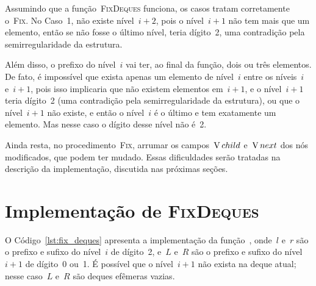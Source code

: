 \documentclass[main.tex]{subfiles}
\begin{document}
Assumindo que a função~\textsc{FixDeques} funciona, os casos tratam corretamente o~\textsc{Fix}. No Caso~1, não existe nível~${i+2}$, pois o nível~${i+1}$ não tem mais que um elemento, então se não fosse o último nível, teria dígito~2, uma contradição pela semirregularidade da estrutura.

Além disso, o prefixo do nível~$i$ vai ter, ao final da função, dois ou três elementos. De fato, é impossível que exista apenas um elemento de nível~$i$ entre os níveis~$i$ e~$i+1$, pois isso implicaria que não existem elementos em~$i+1$, e o nível~$i+1$ teria dígito~2 (uma contradição pela semirregularidade da estrutura), ou que o nível~${i+1}$ não existe, e então o nível~$i$ é o último e tem exatamente um elemento. Mas nesse caso o dígito desse nível não é~2.

Ainda resta, no procedimento~\textsc{Fix}, arrumar os campos~$\operatorname{V}{child}$ e~$\operatorname{V}{next}$ dos nós modificados, que podem ter mudado. Essas dificuldades serão tratadas na descrição da implementação, discutida nas próximas seções.

\section{Implementação de {\normalfont \textsc{FixDeques}}} \label{sec:fix_deques}

O Código~\ref{lst:fix_deques} apresenta a implementação da função~, onde~$l$ e~$r$ são o prefixo e sufixo do nível~$i$ de dígito~2, e~$L$ e~$R$ são o prefixo e sufixo do nível~$i+1$ de dígito~0 ou~1. É possível que o nível~$i+1$ não exista na deque atual; nesse caso~$L$ e~$R$ são deques efêmeras vazias.
\end{document}
